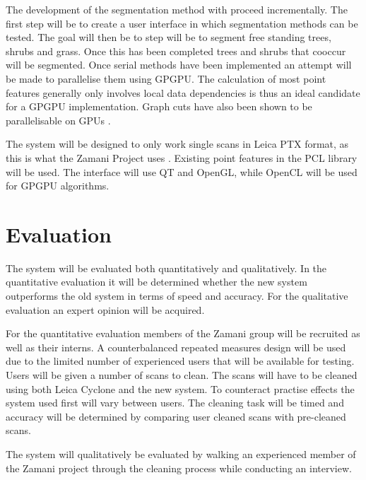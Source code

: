 \documentclass[10pt,twocolumn]{article}
\begin{document}
The development of the segmentation method with proceed incrementally. The first step will be to create a user interface in which segmentation methods can be tested. The goal will then be to step will be to segment free standing trees, shrubs and grass. Once this has been completed trees and shrubs that cooccur will be segmented. Once serial methods have been implemented an attempt will be made to parallelise them using GPGPU. The calculation of most point features generally only involves local data dependencies is thus an ideal candidate for a GPGPU implementation. Graph cuts have also been shown to be parallelisable on GPUs \cite{Hussein2007}.

The system will be designed to only work single scans in Leica PTX format, as this is what the Zamani Project uses \cite{Held2012}. Existing point features in the PCL library \cite{Rusu2011} will be used. The interface will use QT and OpenGL, while OpenCL will be used for GPGPU algorithms.

\section{Evaluation}

The system will be evaluated both quantitatively and qualitatively. In the quantitative evaluation it will be determined whether the new system outperforms the old system in terms of speed and accuracy. For the qualitative evaluation an expert opinion will be acquired.

For the quantitative evaluation members of the Zamani group will be recruited as well as their interns. A counterbalanced repeated measures design will be used due to the limited number of experienced users that will be available for testing. Users will be given a number of scans to clean. The scans will have to be cleaned using both Leica Cyclone and the new system. To counteract practise effects the system used first will vary between users. The cleaning task will be timed and accuracy will be determined by comparing user cleaned scans with pre-cleaned scans.


The system will qualitatively be evaluated by walking an experienced member of the Zamani project through the cleaning process while conducting an interview.
			
\end{document}
